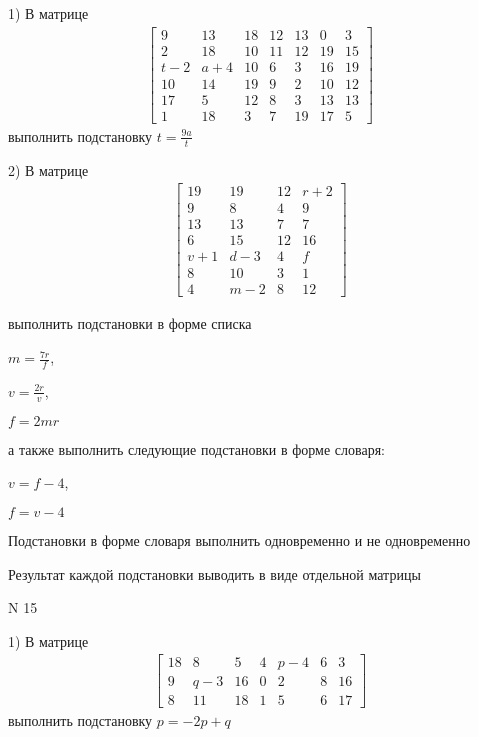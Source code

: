 \documentclass[11pt]{report}
\begin{document}
    1) В матрице
\begin{align*}
\left[\begin{matrix}9 & 13 & 18 & 12 & 13 & 0 & 3\\2 & 18 & 10 & 11 & 12 & 19 & 15\\t - 2 & a + 4 & 10 & 6 & 3 & 16 & 19\\10 & 14 & 19 & 9 & 2 & 10 & 12\\17 & 5 & 12 & 8 & 3 & 13 & 13\\1 & 18 & 3 & 7 & 19 & 17 & 5\end{matrix}\right]
\end{align*}
выполнить подстановку $t=\frac{9 a}{t}$


    2) В матрице
\begin{align*}
\left[\begin{matrix}19 & 19 & 12 & r + 2\\9 & 8 & 4 & 9\\13 & 13 & 7 & 7\\6 & 15 & 12 & 16\\v + 1 & d - 3 & 4 & f\\8 & 10 & 3 & 1\\4 & m - 2 & 8 & 12\end{matrix}\right]
\end{align*}

выполнить подстановки в форме списка

$m=\frac{7 r}{f}$,

$v=\frac{2 r}{v}$,

$f=2 m r$

а также выполнить следующие подстановки в форме словаря:

$v=f - 4$,

$f=v - 4$


    Подстановки в форме словаря выполнить одновременно и не одновременно


    Результат каждой подстановки выводить в виде отдельной матрицы

\newpage
N 15


    1) В матрице
\begin{align*}
\left[\begin{matrix}18 & 8 & 5 & 4 & p - 4 & 6 & 3\\9 & q - 3 & 16 & 0 & 2 & 8 & 16\\8 & 11 & 18 & 1 & 5 & 6 & 17\end{matrix}\right]
\end{align*}
выполнить подстановку $p=- 2 p + q$
\end{document}
